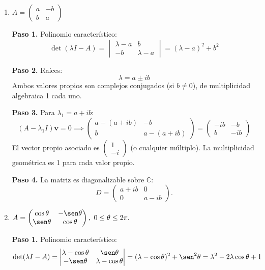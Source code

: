 \begin{prob}
\begin{enumerate}[$a)$]
\item $A=\left(\begin{matrix}
a & -b \\ b & a
\end{matrix}\right)$

\begin{myproof}
\textbf{Paso 1.} Polinomio característico:
\[
\det(\lambda I - A) = \begin{vmatrix} \lambda-a & b \\ -b & \lambda-a \end{vmatrix} = (\lambda-a)^2 + b^2
\]

\textbf{Paso 2.} Raíces:
\[
\lambda = a \pm ib
\]
Ambos valores propios son complejos conjugados (si $b\neq 0$), de multiplicidad algebraica 1 cada uno.

\textbf{Paso 3.} Para $\lambda_1 = a + ib$:
\[
(A - \lambda_1 I)\mathbf{v} = 0 \implies \begin{pmatrix} a-(a+ib) & -b \\ b & a-(a+ib) \end{pmatrix} = \begin{pmatrix} -ib & -b \\ b & -ib \end{pmatrix}
\]
El vector propio asociado es $\begin{pmatrix} 1 \\ -i \end{pmatrix}$ (o cualquier múltiplo). La multiplicidad geométrica es 1 para cada valor propio.

\textbf{Paso 4.} La matriz es diagonalizable sobre $\mathbb{C}$:
\[
\boxed{D = \begin{pmatrix} a+ib & 0 \\ 0 & a-ib \end{pmatrix}.}
\]
\end{myproof}

\item $A=\left(\begin{matrix}
\cos \theta & -\sen \theta \\ \sen \theta & \cos \theta
\end{matrix}\right),\ 0\leq \theta \leq 2\pi.$

\begin{myproof}
\textbf{Paso 1.} Polinomio característico:
\[
\det(\lambda I - A) = \begin{vmatrix} \lambda-\cos\theta & \sen\theta \\ -\sen\theta & \lambda-\cos\theta \end{vmatrix} = (\lambda-\cos\theta)^2 + \sen^2\theta = \lambda^2 - 2\lambda\cos\theta + 1
\]


\end{myproof}
\end{enumerate}
\end{prob}
